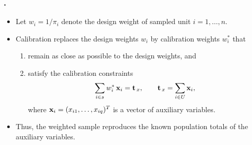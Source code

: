 \documentclass{my_eth_beamer}
\numberwithin{equation}{section}
\begin{document}
\begin{frame}
    \frametitle{\insertsectionnumber.\insertsubsectionnumber~\insertsubsection}
    \begin{itemize}
    \setlength{\itemsep}{8pt}
        \item Let $w_i=1/\pi_i$ denote the \alert{design weight} of sampled
            unit $i = 1, \ldots, n$.
        \item \alert{Calibration} replaces the design weights $w_i$ by
            \alert{calibration weights} $w_i^*$ that \citep{deville_sarndal_1992}
            \vspace{0.25em}
            \begin{enumerate}
            \setlength{\itemsep}{4pt}
                \item remain as close as possible to the design weights, and
                \item satisfy the \alert{calibration constraints}
                    \begin{equation*}
                        \sum_{i\in s}w_i^*\,\bold{x}_i=\bold{t}_{\,x}, \qquad
                        \bold{t}_{\,x}=\sum_{i\in U}\bold{x}_i,
                    \end{equation*}
                    where $\bold{x}_i=(x_{i1},\ldots,x_{iq})^T$
                    is a vector of auxiliary variables.
            \end{enumerate}
        \item Thus, the weighted sample reproduces the known
            \alert{population totals} of the auxiliary variables.
    \end{itemize}
\end{frame}
\end{document}
